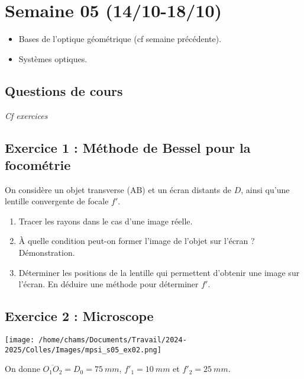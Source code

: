 \section{Semaine 05 (14/10-18/10) }


\begin{itemize}
	\item Bases de l'optique géométrique (cf semaine précédente).
	\item Systèmes optiques.
\end{itemize}

\subsection{Questions de cours}

\textit{Cf exercices}

\subsection{Exercice 1 : Méthode de Bessel pour la focométrie}

On considère un objet transverse (AB) et un écran distants de $D$, ainsi qu'une lentille convergente de focale $f'$.

\begin{enumerate}
	\item Tracer les rayons dans le cas d'une image réelle.
	\item À quelle condition peut-on former l'image de l'objet sur l'écran ? Démonstration.
	\item Déterminer les positions de la lentille qui permettent d'obtenir une image sur l'écran. En déduire une méthode pour déterminer $f'$.
\end{enumerate}

\subsection{Exercice 2 : Microscope}

\begin{minipage}[c]{\linewidth/2}
	\texttt{[image: /home/chams/Documents/Travail/2024-2025/Colles/Images/mpsi\_s05\_ex02.png]}
\end{minipage}%
\begin{minipage}[c]{\linewidth/2}
	On donne $\overline{O_1O_2} = D_0 = \SI{75}{mm}$, $f'_1 = \SI{10}{mm}$ et $f'_2 = \SI{25}{mm}$.
\end{minipage}
 
